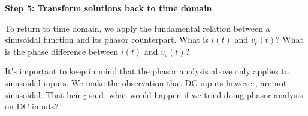 \begin{enumerate}

\qitem \textbf{Step 5: Transform solutions back to time domain}

To return to time domain, we apply the fundamental relation between a sinusoidal function and its phasor counterpart.
What is $i(t)$ and $v_{\text{c}}(t)$? What is the phase difference between $i(t)$ and $v_{\text{c}}(t)$? 



\qitem It's important to keep in mind that the phasor analysis above only applies to sinusoidal inputs. 
We make the observation that DC inputs however, are not sinusoidal. 
That being said, what would happen if we tried doing phasor analysis on DC inputs?


\end{enumerate}